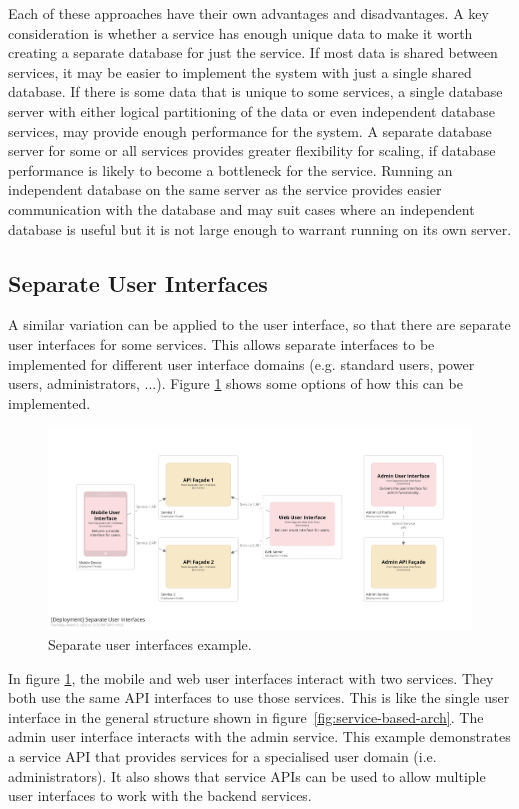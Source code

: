 Each of these approaches have their own advantages and disadvantages.
A key consideration is whether a service has enough unique data to make it worth creating a separate database for just the service.
If most data is shared between services, it may be easier to implement the system with just a single shared database.
If there is some data that is unique to some services, a single database server
with either logical partitioning of the data or even independent database services,
may provide enough performance for the system.
A separate database server for some or all services provides greater flexibility for scaling,
if database performance is likely to become a bottleneck for the service.
Running an independent database on the same server as the service provides easier communication with the database
and may suit cases where an independent database is useful but it is not large enough to warrant running on its own server.

\subsection{Separate User Interfaces}

A similar variation can be applied to the user interface, so that there are separate user interfaces for some services.
This allows separate interfaces to be implemented for different user interface domains
(e.g. standard users, power users, administrators, ...).
Figure \ref{fig:separate-uis} shows some options of how this can be implemented.

\begin{figure}[h!]
    \centering
    \includegraphics[trim=197 197 197 197,clip,width=\textwidth]{diagrams/separate-uis.png}
    \caption{Separate user interfaces example.}
    \label{fig:separate-uis}
\end{figure}

In figure \ref{fig:separate-uis}, the mobile and web user interfaces interact with two services.
They both use the same API interfaces to use those services.
This is like the single user interface in the general structure shown in figure~\ref{fig:service-based-arch}.
The admin user interface interacts with the admin service.
This example demonstrates a service API that provides services for a specialised user domain (i.e. administrators).
It also shows that service APIs can be used to allow multiple user interfaces to work with the backend services.

